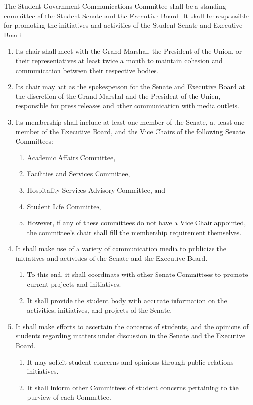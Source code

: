 \item The Student Government Communications Committee shall be a standing committee of the Student Senate and the Executive
Board. It shall be responsible for promoting the initiatives and activities of the Student Senate and Executive Board.
\begin{enumerate}
\item Its chair shall meet with the Grand Marshal, the President of the Union, or their representatives at least twice a month to maintain cohesion and communication between their respective bodies.
\item Its chair may act as the spokesperson for the Senate and Executive Board at the discretion of the Grand Marshal and the President of the Union, responsible for press releases and other communication with media outlets.
\item Its membership shall include at least one member of the Senate, at least one member of the Executive Board, and the Vice
Chairs of the following Senate Committees:
\begin{enumerate}
\item Academic Affairs Committee,
\item Facilities and Services Committee,
\item Hospitality Services Advisory Committee, and
\item Student Life Committee,
\item However, if any of these committees do not have a Vice Chair appointed, the committee's chair shall fill the membership requirement themselves.
\end{enumerate}
\item It shall make use of a variety of communication media to publicize the initiatives and activities of the Senate and the
Executive Board.
\begin{enumerate}
\item To this end, it shall coordinate with other Senate Committees to promote current projects and initiatives.
\item It shall provide the student body with accurate information on the activities, initiatives, and projects of the Senate.
\end{enumerate}
\item It shall make efforts to ascertain the concerns of students, and the opinions of students regarding matters under discussion
in the Senate and the Executive Board.
\begin{enumerate}
\item It may solicit student concerns and opinions through public relations initiatives.
\item It shall inform other Committees of student concerns pertaining to the purview of each Committee.
\end{enumerate}


\end{enumerate}
